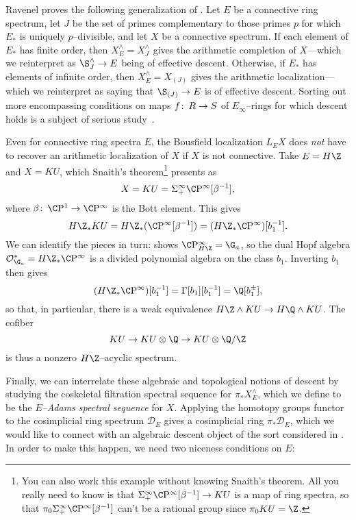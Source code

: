 \begin{remark}
Ravenel proves the following generalization of .  Let $E$ be a connective ring spectrum, let $J$ be the set of primes complementary to those primes $p$ for which $E_*$ is uniquely $p$--divisible, and let $X$ be a connective spectrum.  If each element of $E_*$ has finite order, then $X^\wedge_E = X^\wedge_J$ gives the arithmetic completion of $X$---which we reinterpret as $\S^\wedge_J \to E$ being of effective descent.  Otherwise, if $E_*$ has elements of infinite order, then $X^\wedge_E = X_{(J)}$ gives the arithmetic localization---which we reinterpret as saying that $\S_{(J)} \to E$ is of effective descent.  Sorting out more encompassing conditions on maps $f\colon\thinspace R \to S$ of $E_\infty$--rings for which descent holds is a subject of serious study~\cite[Appendix D]{LurieSAG}.
\end{remark}

\begin{remark}
Even for connective ring spectra $E$, the Bousfield localization $L_E X$ does \emph{not} have to recover an arithmetic localization of $X$ if $X$ is not connective.  Take $E = H\Z$ and $X = KU$, which Snaith's theorem\footnote{You can also work this example without knowing Snaith's theorem. All you really need to know is that $\Susp^\infty_+ \CP^\infty[\beta^{-1}] \to KU$ is a map of ring spectra, so that $\pi_0 \Susp^\infty_+ \CP^\infty[\beta^{-1}]$ can't be a rational group since $\pi_0 KU = \Z$.} presents as \[X = KU = \Susp^\infty_+ \CP^\infty[\beta^{-1}],\] where $\beta\co \CP^1 \to \CP^\infty$ is the Bott element.  This gives \[H\Z_* KU = H\Z_*(\CP^\infty[\beta^{-1}]) = (H\Z_* \CP^\infty)[b_1^{-1}].\]  We can identify the pieces in turn:  shows $\CP^\infty_{H\Z} = \G_a$, so the dual Hopf algebra $\sheaf O_{\G_a}^* = H\Z_* \CP^\infty$ is a divided polynomial algebra on the class $b_1$.  Inverting $b_1$ then gives \[(H\Z_* \CP^\infty)[b_1^{-1}] = \Gamma[b_1][b_1^{-1}] = \Q[b_1^\pm],\] so that, in particular, there is a weak equivalence $H\Z \sm KU \to H\Q \sm KU$.  The cofiber \[KU \to KU \otimes \Q \to KU \otimes \Q/\Z\] is thus a nonzero $H\Z$--acyclic spectrum.
\end{remark}

Finally, we can interrelate these algebraic and topological notions of descent by studying the coskeletal filtration spectral sequence for $\pi_* X^\wedge_E$, which we define to be the \textit{$E$--Adams spectral sequence} for $X$.  Applying the homotopy groups functor to the cosimplicial ring spectrum $\mathcal D_E$ gives a cosimplicial ring $\pi_* \mathcal D_E$, which we would like to connect with an algebraic descent object of the sort considered in .  In order to make this happen, we need two niceness conditions on $E$:

